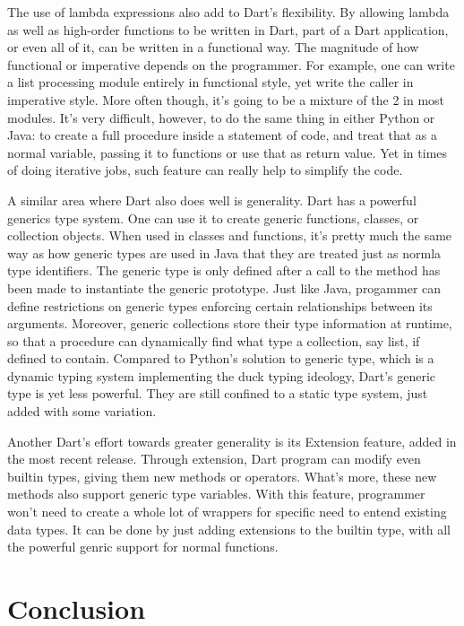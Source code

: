 \documentclass[letterpaper,twocolumn,10pt]{article}
\begin{document}
The use of lambda expressions also add to Dart's flexibility. 
By allowing lambda as well as high-order functions to be written in Dart, part of a Dart application, or even all of it, can be written in a functional way.
The magnitude of how functional or imperative depends on the programmer.
For example, one can write a list processing module entirely in functional style, yet write the caller in imperative style.
More often though, it's going to be a mixture of the 2 in most modules.
It's very difficult, however, to do the same thing in either Python or Java: to create a full procedure inside a statement of code, and treat that as a normal variable, passing it to functions or use that as return value.
Yet in times of doing iterative jobs, such feature can really help to simplify the code.

A similar area where Dart also does well is generality.
Dart has a powerful generics type system.
One can use it to create generic functions, classes, or collection objects.
When used in classes and functions, it's pretty much the same way as how generic types are used in Java that they are treated just as normla type identifiers.
The generic type is only defined after a call to the method has been made to instantiate the generic prototype.
Just like Java, progammer can define restrictions on generic types enforcing certain relationships between its arguments.
Moreover, generic collections store their type information at runtime, so that a procedure can dynamically find what type a collection, say list, if defined to contain.
Compared to Python's solution to generic type, which is a dynamic typing system implementing the duck typing ideology, Dart's generic type is yet less powerful.
They are still confined to a static type system, just added with some variation.

Another Dart's effort towards greater generality is its Extension feature, added in the most recent release.
Through extension, Dart program can modify even builtin types, giving them new methods or operators.
What's more, these new methods also support generic type variables.
With this feature, programmer won't need to create a whole lot of wrappers for specific need to entend existing data types.
It can be done by just adding extensions to the builtin type, with all the powerful genric support for normal functions.

\section{Conclusion}
\end{document}
